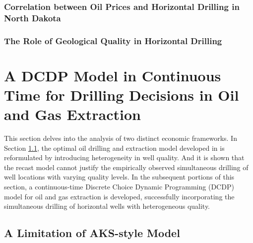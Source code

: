 \subsubsection{Correlation between Oil Prices and Horizontal Drilling in North Dakota}
\label{C3-SubSubSection:Correlation-between-Oil-Prices-and-Horizontal-Drilling-in-ND}


\subsubsection{The Role of Geological Quality in Horizontal Drilling}
\label{C3-SubSubSection:The-Role-of-Geological-Quality-in-Horizontal-Drilling}






\section{A DCDP Model in Continuous Time for Drilling Decisions in Oil and Gas Extraction}
\label{C3-Section:A-DCDP-Model-in-Continuous-Time}
This section delves into the analysis of two distinct economic frameworks. In Section \ref{C3-SubSection:A-Limitation-of-AKS-style-Model}, the optimal oil drilling and extraction model developed in \cite{Hotelling-under-Pressure_AKS_2018} is reformulated by introducing heterogeneity in well quality. And it is shown that the recast model cannot justify the empirically observed simultaneous drilling of well locations with varying quality levels. In the subsequent portions of this section, a continuous-time Discrete Choice Dynamic Programming (DCDP) model for oil and gas extraction is developed, successfully incorporating the simultaneous drilling of horizontal wells with heterogeneous quality.

\subsection{A Limitation of AKS-style Model}
\label{C3-SubSection:A-Limitation-of-AKS-style-Model}


